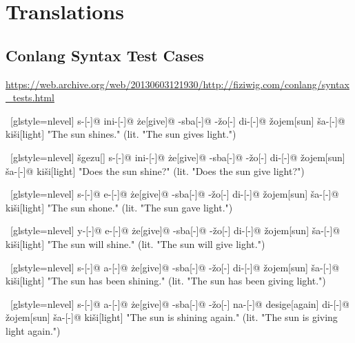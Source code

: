 \section{Translations}

\subsection{Conlang Syntax Test Cases}
\url{https://web.archive.org/web/20130603121930/http://fiziwig.com/conlang/syntax_tests.html}

\begingroup
{}

\ex~[glstyle=nlevel]
\begingl
\glpreamble {}
\endpreamble
s-[{\Ind}-]@
ini-[{\Hab}-]@
\.{z}e[give]@
-sba[-{\Inan}]@
-\v{z}o[-{\Inan}]
di-[{\Erg}-]@
\v{z}ojem[sun]
\v{s}a-[{\Acc}-]@
ki\v{s}i[light]
\glft "The sun shines." (lit. "The sun gives light.")
\endgl
\xe

\ex~[glstyle=nlevel]
\begingl
\glpreamble {}
\endpreamble
\v{s}gezu[{\Yn}]
s-[{\Hab}-]@
ini-[{\Prog}-]@
\.{z}e[give]@
-sba[-{\Inan}]@
-\v{z}o[-{\Inan}]
di-[{\Erg}-]@
\v{z}ojem[sun]
\v{s}a-[{\Acc}-]@
ki\v{s}i[light]
\glft "Does the sun shine?" (lit. "Does the sun give light?")
\endgl
\xe

\ex~[glstyle=nlevel]
\begingl
\glpreamble {}
\endpreamble
s-[{\Ind}-]@
e-[{\Pfv}-]@
\.{z}e[give]@
-sba[-{\Inan}]@
-\v{z}o[-{\Inan}]
di-[{\Erg}-]@
\v{z}ojem[sun]
\v{s}a-[{\Acc}-]@
ki\v{s}i[light]
\glft "The sun shone." (lit. "The sun gave light.")
\endgl
\xe

\ex~[glstyle=nlevel]
\begingl
\glpreamble {}
\endpreamble
y-[{\Sjv}-]@
e-[{\Pfv}-]@
\.{z}e[give]@
-sba[-{\Inan}]@
-\v{z}o[-{\Inan}]
di-[{\Erg}-]@
\v{z}ojem[sun]
\v{s}a-[{\Acc}-]@
ki\v{s}i[light]
\glft "The sun will shine." (lit. "The sun will give light.")
\endgl
\xe

\ex~[glstyle=nlevel]
\begingl
\glpreamble {}
\endpreamble
s-[{\Ind}-]@
a-[{\Prog}-]@
\.{z}e[give]@
-sba[-{\Inan}]@
-\v{z}o[-{\Inan}]
di-[{\Erg}-]@
\v{z}ojem[sun]
\v{s}a-[{\Acc}-]@
ki\v{s}i[light]
\glft "The sun has been shining." (lit. "The sun has been giving light.")
\endgl
\xe

\ex~[glstyle=nlevel]
\begingl
\glpreamble {}
\endpreamble
s-[{\Ind}-]@
a-[{\Prog}-]@
\.{z}e[give]@
-sba[-{\Inan}]@
-\v{z}o[-{\Inan}]
na-[{\Prog}-]@
desige[again]
di-[{\Erg}-]@
\v{z}ojem[sun]
\v{s}a-[{\Acc}-]@
ki\v{s}i[light]
\glft "The sun is shining again." (lit. "The sun is giving light again.")
\endgl
\xe

